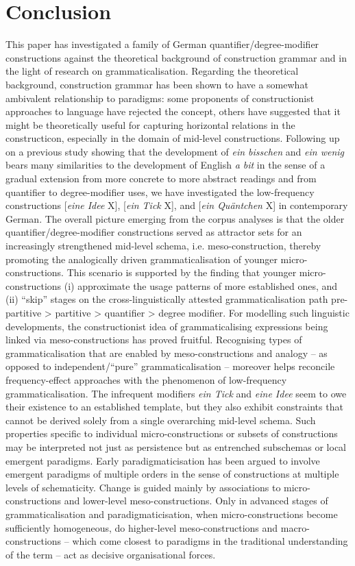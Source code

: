 \documentclass[output=paper]{langsci/langscibook}
\begin{document}
\section{Conclusion} \label{sec5}
This paper has investigated a family of German quantifier\slash degree\hyp{}modifier constructions against the theoretical background of construction grammar and in the light of research on grammaticalisation. Regarding the theoretical background, construction grammar has been shown to have a somewhat ambivalent relationship to paradigms: some proponents of constructionist approaches to language have rejected the concept, others have suggested that it might be theoretically useful for capturing horizontal relations in the constructicon, especially in the domain of mid-level constructions. \largerpage{}
Following up on a previous study showing that the development of \textit{ein bisschen} and \textit{ein wenig} bears many similarities to the development of English \textit{a bit} in the sense of a gradual extension from more concrete to more abstract readings and from quantifier to degree\hyp{}modifier uses, we have investigated the low-frequency constructions [\textit{eine Idee} X], [\textit{ein Tick} X], and [\textit{ein Quäntchen} X] in contemporary German. The overall picture emerging from the corpus analyses is that the older quantifier\slash degree\hyp{}modifier constructions served as attractor sets for an increasingly strengthened mid-level schema, i.e. meso-construction, thereby promoting the analogically driven grammaticalisation of younger micro\hyp{}constructions. This scenario is supported by the finding that younger micro\hyp{}constructions (i) approximate the usage patterns of more established ones, and (ii) “skip” stages on the cross-linguistically attested grammaticalisation path pre-partitive > partitive > quantifier > degree modifier. For modelling such linguistic developments, the constructionist idea of grammaticalising expressions being linked via meso\hyp{}constructions has proved fruitful. Recognising types of grammaticalisation that are enabled by meso\hyp{}constructions and analogy – as opposed to independent/“pure” grammaticalisation \citep[]{Lehmann2004a} – moreover helps reconcile frequency-effect approaches with the phenomenon of low-frequency grammaticalisation. The infrequent modifiers \textit{ein Tick} and \textit{eine Idee} seem to owe their existence to an established template, but they also exhibit constraints that cannot be derived solely from a single overarching mid-level schema. Such properties specific to individual micro\hyp{}constructions or subsets of constructions may be interpreted not just as persistence but as entrenched subschemas or local emergent paradigms. Early paradigmaticisation has been argued to involve emergent paradigms of multiple orders in the sense of constructions at multiple levels of schematicity. Change is guided mainly by associations to micro\hyp{}constructions and lower-level meso\hyp{}constructions. Only in advanced stages of grammaticalisation and paradigmaticisation, when micro\hyp{}constructions become sufficiently homogeneous, do higher-level meso\hyp{}constructions and macro-constructions – which come closest to paradigms in the traditional understanding of the term – act as decisive organisational forces. 
\end{document}
